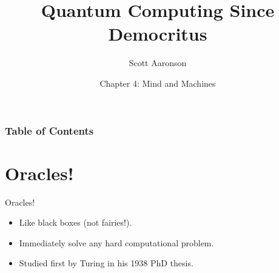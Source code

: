 \documentclass[
    11pt, %
    aspectratio=169, %
]{beamer}
\title[Mind and Machines]{Quantum Computing Since Democritus}
\subtitle{Scott Aaronson}
\author[Quantum Computing Since Democritus]{Chapter 4: Mind and Machines}
\institute[]{Saumya Chaturvedi \\ \smallskip }
\date[27 March 2023]
\begin{document}
\section{}
\begin{frame}
	\titlepage %
 
\end{frame}


\begin{frame}
	\frametitle{Table of Contents} %
	
	\tableofcontents %
\end{frame}

\section{Oracles!}
\begin{frame}{Oracles!}
\begin{itemize}
    \item Like black boxes (not fairies!).
    \item Immediately solve any hard computational problem.
    \item Studied first by Turing in his 1938 PhD thesis.
\end{itemize}
\end{frame}
\end{document}
